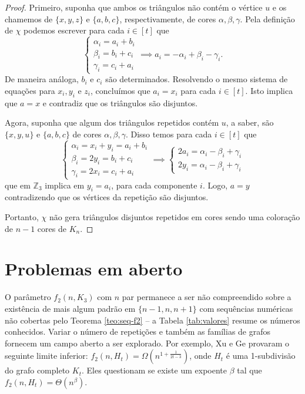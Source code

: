 \documentclass[12pt,a4paper]{book}
\def\ZZ{\mathds Z}
\def\ZZ{{\mathbb Z}}
\begin{document}
\begin{proof}
        Primeiro, suponha que ambos os triângulos não contém o vértice $u$ e os chamemos de $\{x,y,z\}$ e $\{a,b,c\}$, respectivamente, de cores $\alpha, \beta, \gamma$. Pela definição de $\chi$ podemos escrever para cada $i \in [t]$ que
        \[
            \left\{\begin{matrix}
            \alpha_i = a_i +b_i\\ 
            \beta_i = b_i+c_i\\ 
            \gamma_i = c_i+a_i
            \end{matrix}\right.
            \implies a_i = -\alpha_i+\beta_i-\gamma_i.
        \]
        De maneira análoga, $b_i$ e $c_i$ são determinados. 
        Resolvendo o mesmo sistema de equações para $x_i, y_i$ e $z_i$,
        concluímos que $a_i = x_i$ para cada $i \in [t]$.
        Isto implica que $a = x$ e contradiz que os triângulos são disjuntos.
        
        Agora, suponha que algum dos triângulos repetidos contém $u$, a saber, são $\{x,y,u\}$ e $\{a,b,c\}$ de cores $\alpha, \beta, \gamma$. 
        Disso temos para cada $i \in [t]$ que
        \[
            \left\{\begin{matrix}
            \alpha_i = x_i+y_i = a_i +b_i\\ 
            \beta_i = 2y_i = b_i+c_i\\ 
            \gamma_i = 2x_i = c_i+a_i
            \end{matrix}\right.
            \implies 
            \left\{\begin{matrix}
            2a_i = \alpha_i - \beta_i + \gamma_i\\ 
            2y_i = \alpha_i - \beta_i + \gamma_i
            \end{matrix}\right.
        \]
        que em $\ZZ_3$ implica em $y_i = a_i$, para cada componente $i$. Logo, $a = y$ contradizendo que os vértices da repetição  são disjuntos.

        Portanto, $\chi$ não gera triângulos disjuntos repetidos em cores sendo uma coloração de $n-1$ cores de $K_n$.
    \end{proof}
    
    \section{Problemas em aberto}
\label{subsec:repeated-prob}

        O parâmetro $f_2(n, K_3)$ com $n$ par permanece a ser não compreendido sobre a existência de mais algum padrão em $\{n-1,n,n+1\}$ com sequências numéricas não cobertas pelo Teorema \ref{teo:seq-f2}   -- a Tabela \ref{tab:valores} resume os números conhecidos.
        Variar o número de repetições e também as famílias de grafos fornecem um campo aberto a ser explorado.
        Por exemplo, Xu e Ge \cite{xu2022color} provaram o seguinte limite inferior: $f_2(n, H_t) = \Omega(n^{1+\frac{1}{2t-3}})$, onde $H_t$ é uma 1-subdivisão do grafo completo $K_t$. Eles questionam se existe um expoente $\beta$ tal que $f_2(n, H_t) = \Theta(n^\beta)$.
        
\end{document}

